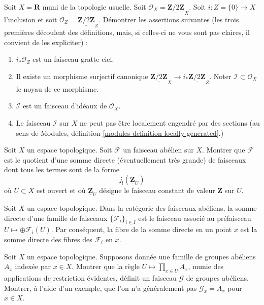 \begin{exercise}
\label{exercise-not-locally-generated-by-sections}
Soit $X = \mathbf{R}$ muni de la topologie usuelle.
Soit $\mathcal{O}_X = \underline{\mathbf{Z}/2\mathbf{Z}}_X$.
Soit $i : Z = \{0\} \to X$ l'inclusion et soit
$\mathcal{O}_Z = \underline{\mathbf{Z}/2\mathbf{Z}}_Z$.
Démontrer les assertions suivantes (les trois premières découlent des définitions, mais, si
celles-ci ne vous sont pas claires, il convient de les expliciter) :
\begin{enumerate}
\item $i_*\mathcal{O}_Z$ est un faisceau gratte-ciel.
\item Il existe un morphisme surjectif canonique
$\underline{\mathbf{Z}/2\mathbf{Z}}_X \to
i_*\underline{\mathbf{Z}/2\mathbf{Z}}_Z$.
Noter $\mathcal{I} \subset \mathcal{O}_X$ le noyau de ce morphisme.
\item $\mathcal{I}$ est un faisceau d'idéaux de $\mathcal{O}_X$.
\item Le faisceau $\mathcal{I}$ sur $X$ ne peut pas être localement engendré
par des sections (au sens de
Modules, définition \ref{modules-definition-locally-generated}.)
\end{enumerate}
\end{exercise}

\begin{exercise}
\label{exercise-quotient-j-shriek-Z}
Soit $X$ un espace topologique.
Soit ${\mathcal F}$ un faisceau abélien sur $X$. Montrer
que ${\mathcal F}$ est le quotient d'une somme directe (éventuellement très grande)
de faisceaux dont tous les termes sont de la forme
$$
j_{!}(\underline{{\mathbf Z}}_U)
$$
où $U \subset X$ est ouvert et où $\underline{{\mathbf Z}}_U$ désigne le
faisceau constant de valeur ${\mathbf Z}$ sur $U$.
\end{exercise}

\begin{remark}
\label{remark-direct-sum-stalk-abelian}
Soit $X$ un espace topologique.
Dans la catégorie des faisceaux abéliens, la somme directe
d'une famille de faisceaux $\{{\mathcal F}_i\}_{i\in I}$ est le faisceau associé au
préfaisceau $U \mapsto \oplus {\mathcal F}_i(U)$. Par conséquent, la fibre de
la somme directe en un point $x$ est la somme directe des fibres des
${\mathcal F}_i$ en $x$.
\end{remark}

\begin{exercise}
\label{exercise-product-over-points}
Soit $X$ un espace topologique. Supposons donnée une famille de
groupes abéliens $A_x$ indexée par $x \in X$. Montrer que la règle
$U \mapsto \prod_{x \in U} A_x$, munie des applications de restriction évidentes,
définit un faisceau $\mathcal{G}$ de groupes abéliens. Montrer, à l'aide d'un exemple,
que l'on n'a généralement pas $\mathcal{G}_x = A_x$ pour $x \in X$.
\end{exercise}

